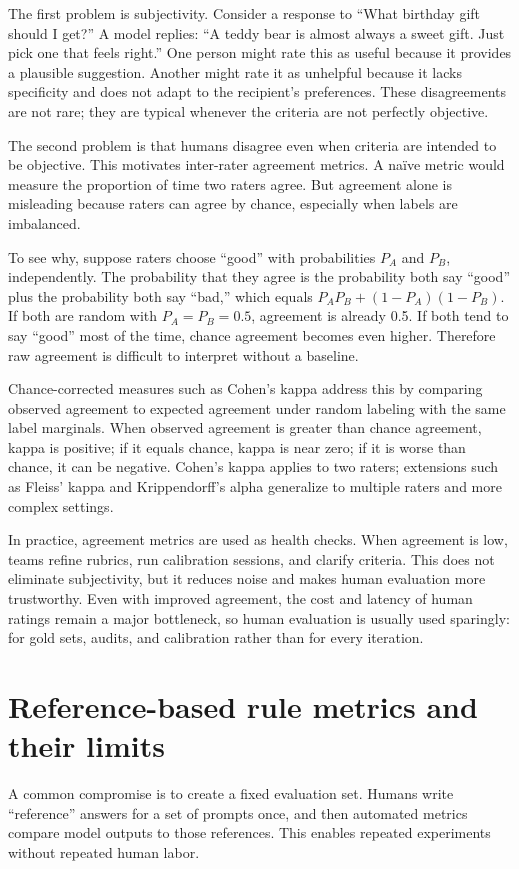 The first problem is subjectivity. Consider a response to “What birthday gift should I get?” A model replies: “A teddy bear is almost always a sweet gift. Just pick one that feels right.” One person might rate this as useful because it provides a plausible suggestion. Another might rate it as unhelpful because it lacks specificity and does not adapt to the recipient’s preferences. These disagreements are not rare; they are typical whenever the criteria are not perfectly objective.

The second problem is that humans disagree even when criteria are intended to be objective. This motivates inter-rater agreement metrics. A naïve metric would measure the proportion of time two raters agree. But agreement alone is misleading because raters can agree by chance, especially when labels are imbalanced.

To see why, suppose raters choose “good” with probabilities \(P_A\) and \(P_B\), independently. The probability that they agree is the probability both say “good” plus the probability both say “bad,” which equals \(P_A P_B + (1-P_A)(1-P_B)\). If both are random with \(P_A = P_B = 0.5\), agreement is already 0.5. If both tend to say “good” most of the time, chance agreement becomes even higher. Therefore raw agreement is difficult to interpret without a baseline.

Chance-corrected measures such as Cohen’s kappa address this by comparing observed agreement to expected agreement under random labeling with the same label marginals. When observed agreement is greater than chance agreement, kappa is positive; if it equals chance, kappa is near zero; if it is worse than chance, it can be negative. Cohen’s kappa applies to two raters; extensions such as Fleiss’ kappa and Krippendorff’s alpha generalize to multiple raters and more complex settings.

In practice, agreement metrics are used as health checks. When agreement is low, teams refine rubrics, run calibration sessions, and clarify criteria. This does not eliminate subjectivity, but it reduces noise and makes human evaluation more trustworthy. Even with improved agreement, the cost and latency of human ratings remain a major bottleneck, so human evaluation is usually used sparingly: for gold sets, audits, and calibration rather than for every iteration.

\section{Reference-based rule metrics and their limits}
A common compromise is to create a fixed evaluation set. Humans write “reference” answers for a set of prompts once, and then automated metrics compare model outputs to those references. This enables repeated experiments without repeated human labor.

